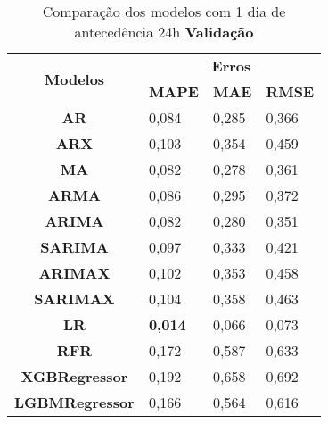 \begin{table}[H]
	\centering
	\caption{Comparação dos modelos com 1 dia de antecedência 24h \textbf{Validação} }\label{tb:1-24vld}
	\begin{tabular}{@{}clll@{}}
		\toprule
		\multirow{2}{*}{\textbf{Modelos}} & \multicolumn{3}{c}{\textbf{Erros}}                                                                       \\ \cmidrule(l){2-4} 
		& \multicolumn{1}{c}{\textbf{MAPE}} & \multicolumn{1}{c}{\textbf{MAE}} & \multicolumn{1}{c}{\textbf{RMSE}} \\ \hline
\textbf{AR}                       & 0,084                             & 0,285                            & 0,366                             \\
\textbf{ARX}                      & 0,103                             & 0,354                            & 0,459                             \\
\textbf{MA}                       & 0,082                             & 0,278                            & 0,361                             \\
\textbf{ARMA}                     & 0,086                             & 0,295                            & 0,372                             \\
\textbf{ARIMA}                    & 0,082                             & 0,280                            & 0,351                             \\
\textbf{SARIMA}                   & 0,097                             & 0,333                            & 0,421                             \\
\textbf{ARIMAX}                   & 0,102                             & 0,353                            & 0,458                             \\
\textbf{SARIMAX}                  & 0,104                             & 0,358                            & 0,463                             \\
\textbf{LR}                       & \textbf{0,014}                             & 0,066                            & 0,073                             \\
\textbf{RFR}                      & 0,172                             & 0,587                            & 0,633                             \\
\textbf{XGBRegressor}             & 0,192                             & 0,658                            & 0,692                             \\
\textbf{LGBMRegressor}            & 0,166                             & 0,564                            & 0,616                             \\ \bottomrule
	\end{tabular}

\end{table}

